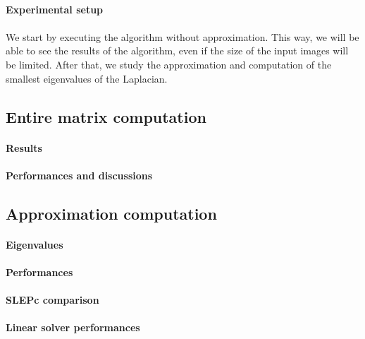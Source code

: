 \paragraph{Experimental setup}


\paragraph{}
We start by executing the algorithm without approximation.
This way, we will be able to see the results of the algorithm, even if the size of the input images will be limited.
After that, we study the approximation and computation of the smallest eigenvalues of the Laplacian.

\subsection{Entire matrix computation}

\paragraph{Results}


\paragraph{Performances and discussions}


\subsection{Approximation computation}

\paragraph{Eigenvalues}


\paragraph{Performances}


\paragraph{SLEPc comparison}


\paragraph{Linear solver performances}


